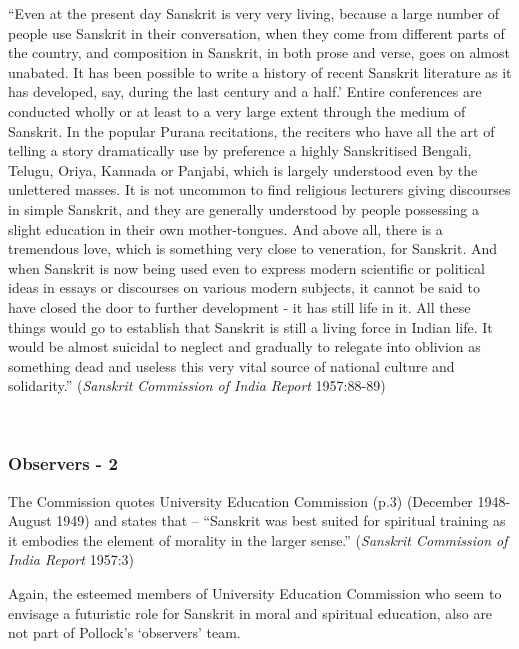 \begin{myquote}
\eleven
“Even at the present day Sanskrit is very very living, because a large number of people use Sanskrit in their conversation, when they come from different parts of the country, and composition in Sanskrit, in both prose and verse, goes on almost unabated. It has been possible to write a history of recent Sanskrit literature as it has developed, say, during the last century and a half.' Entire conferences are conducted wholly or at least to a very large extent through the medium of Sanskrit. In the popular Purana recitations, the reciters who have all the art of telling a story dramatically use by preference a highly Sanskritised Bengali, Telugu, Oriya, Kannada or Panjabi, which is largely understood even by the unlettered masses. It is not uncommon to find religious lecturers giving discourses in simple Sanskrit, and they are generally understood by people possessing a slight education in their own mother-tongues. And above all, there is a tremendous love, which is something very close to veneration, for Sanskrit. And when Sanskrit is now being used even to express modern scientific or political ideas in essays or discourses on various modern subjects, it cannot be said to have closed the door to further development - it has still life in it. All these things would go to establish that Sanskrit is still a living force in Indian life. It would be almost suicidal to neglect and gradually to relegate into oblivion as something dead and useless this very vital source of national culture and solidarity.” \hfill({\sl Sanskrit Commission of India Report} 1957:88-89)
\end{myquote}

~\\[-30pt]
 
\subsubsection{Observers - 2}
\vskip -5pt
The Commission quotes University Education Commission (p.3) (December 1948- August 1949) and states that – “Sanskrit was best suited for spiritual training as it embodies the element of morality in the larger sense.” ({\sl Sanskrit Commission of India Report} 1957:3)

Again, the esteemed members of University Education Commission who seem to envisage a futuristic role for Sanskrit in moral and spiritual education, also are not part of Pollock’s ‘observers’ team.

